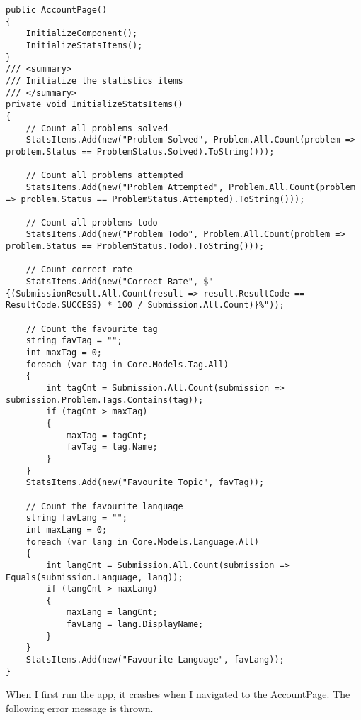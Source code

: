 \documentclass[report.tex]{subfiles}
\begin{document}
\begin{verbatim}
public AccountPage()
{
    InitializeComponent();
    InitializeStatsItems();
}
/// <summary>
/// Initialize the statistics items
/// </summary>
private void InitializeStatsItems()
{
    // Count all problems solved
    StatsItems.Add(new("Problem Solved", Problem.All.Count(problem => problem.Status == ProblemStatus.Solved).ToString()));
    
    // Count all problems attempted
    StatsItems.Add(new("Problem Attempted", Problem.All.Count(problem => problem.Status == ProblemStatus.Attempted).ToString()));
    
    // Count all problems todo
    StatsItems.Add(new("Problem Todo", Problem.All.Count(problem => problem.Status == ProblemStatus.Todo).ToString()));

    // Count correct rate
    StatsItems.Add(new("Correct Rate", $"{(SubmissionResult.All.Count(result => result.ResultCode == ResultCode.SUCCESS) * 100 / Submission.All.Count)}%"));

    // Count the favourite tag
    string favTag = "";
    int maxTag = 0;
    foreach (var tag in Core.Models.Tag.All)
    {
        int tagCnt = Submission.All.Count(submission => submission.Problem.Tags.Contains(tag));
        if (tagCnt > maxTag)
        {
            maxTag = tagCnt;
            favTag = tag.Name;
        }
    }
    StatsItems.Add(new("Favourite Topic", favTag));

    // Count the favourite language
    string favLang = "";
    int maxLang = 0;
    foreach (var lang in Core.Models.Language.All)
    {
        int langCnt = Submission.All.Count(submission => Equals(submission.Language, lang));
        if (langCnt > maxLang)
        {
            maxLang = langCnt;
            favLang = lang.DisplayName;
        }
    }
    StatsItems.Add(new("Favourite Language", favLang));
}
\end{verbatim}

When I first run the app, it crashes when I navigated to the AccountPage. The following error message is thrown.
\end{document}
